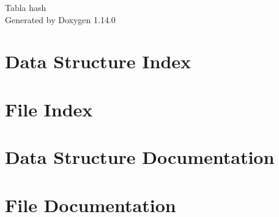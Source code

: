 \documentclass[twoside]{book}
\newcommand{\+}{\discretionary{\mbox{\scriptsize$\hookleftarrow$}}{}{}}
\newcommand{\clearemptydoublepage}{%
    \newpage{\pagestyle{empty}\cleardoublepage}%
  }
\begin{document}
  \raggedbottom
    \hypersetup{pageanchor=false,
                bookmarksnumbered=true,
                pdfencoding=unicode
               }
  \begin{titlepage}
  \vspace*{7cm}
  \begin{center}%
  {\Large Tabla hash}\\
  \vspace*{1cm}
  {\large Generated by Doxygen 1.14.0}\\
  \end{center}
  \end{titlepage}
  \clearemptydoublepage
  \tableofcontents
  \clearemptydoublepage
  \hypersetup{pageanchor=true}
\chapter{Data Structure Index}

\chapter{File Index}

\chapter{Data Structure Documentation}

\chapter{File Documentation}






  \backmatter
  \newpage
  \clearemptydoublepage
  \printindex
\end{document}
